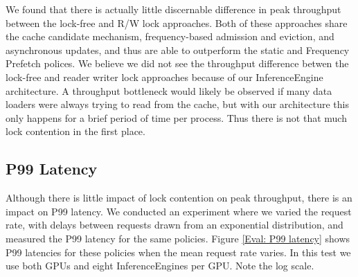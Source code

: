 We found that there is actually little discernable difference in peak throughput between the lock-free and R/W lock approaches. Both of these approaches share the cache candidate mechanism, frequency-based admission and eviction, and asynchronous updates, and thus are able to outperform the static and Frequency Prefetch polices. We believe we did not see the throughput difference betwen the lock-free and reader writer lock approaches because of our InferenceEngine architecture. A throughput bottleneck would likely be observed if many data loaders were always trying to read from the cache, but with our architecture this only happens for a brief period of time per process. Thus there is not that much lock contention in the first place.

\subsection{P99 Latency}
Although there is little impact of lock contention on peak throughput, there is an impact on P99 latency. We conducted an experiment where we varied the request rate, with delays between requests drawn from an exponential distribution, and measured the P99 latency for the same policies. Figure \ref{Eval: P99 latency} shows P99 latencies for these policies when the mean request rate varies. In this test we use both GPUs and eight InferenceEngines per GPU. Note the log scale.

